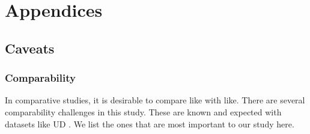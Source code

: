 \documentclass[USenglish]{article}
\begin{document}

\newpage

\setcounter{section}{0}
\renewcommand\thesection{\Alph{section}}
\section{Appendices}

\subsection{Caveats}
\label{sec:caveats}

\subsubsection{Comparability}
\label{caveat_comparability}
In comparative studies, it is desirable to compare like with like. There are several comparability challenges in this study. These are known and expected with datasets like UD \citep{UD_2.14}. We list the ones that are most important to our study here. 
\end{document}
